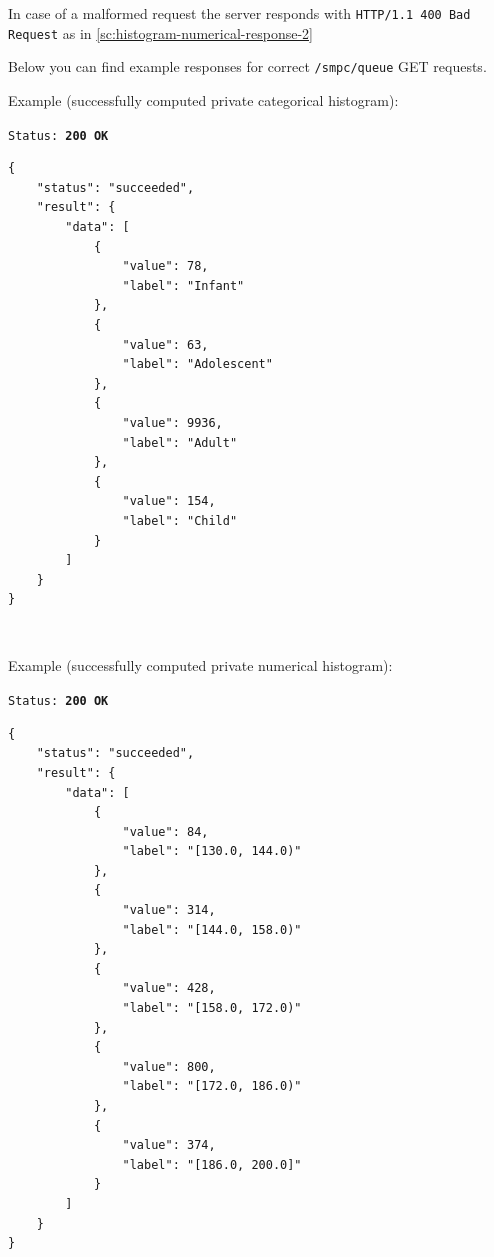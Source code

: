 \begin{description}[labelwidth=5em, leftmargin=\dimexpr\labelwidth+\labelsep\relax]
In case of a malformed request the server responds with \texttt{HTTP/1.1 400 Bad Request} as in \ref{sc:histogram-numerical-response-2}

Below you can find example responses for correct \texttt{/smpc/queue} GET requests.


\begin{minipage}{\linewidth}
  Example (successfully computed private categorical histogram):\\
{
\texttt{Status: {\color{ForestGreen}\textbf{200 OK}}}
\begin{verbatim}
{
    "status": "succeeded",
    "result": {
        "data": [
            {
                "value": 78,
                "label": "Infant"
            },
            {
                "value": 63,
                "label": "Adolescent"
            },
            {
                "value": 9936,
                "label": "Adult"
            },
            {
                "value": 154,
                "label": "Child"
            }
        ]
    }
}
\end{verbatim}
\label{sc:get-response-sucessful-1}
}
\end{minipage}
\ \\
\begin{minipage}{\linewidth}
  Example (successfully computed private numerical histogram):\\
{
\texttt{Status: {\color{ForestGreen}\textbf{200 OK}}}
\begin{verbatim}
{
    "status": "succeeded",
    "result": {
        "data": [
            {
                "value": 84,
                "label": "[130.0, 144.0)"
            },
            {
                "value": 314,
                "label": "[144.0, 158.0)"
            },
            {
                "value": 428,
                "label": "[158.0, 172.0)"
            },
            {
                "value": 800,
                "label": "[172.0, 186.0)"
            },
            {
                "value": 374,
                "label": "[186.0, 200.0]"
            }
        ]
    }
}
\end{verbatim}
\label{sc:get-response-sucessful-2}
}
\end{minipage}


\end{description}
